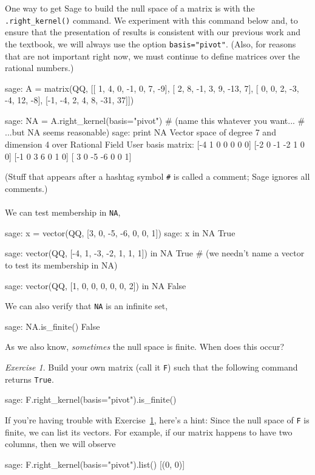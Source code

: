\documentclass[fleqn,11pt]{paper}
\theoremstyle{remark}
\newtheorem{exercise}{Exercise}
\newcommand{\<}{\ensuremath{\langle}}
\renewcommand{\>}{\ensuremath{\rangle}}
\begin{document}
One way to get Sage to build the null space of a matrix is with the
{\tt .right\_kernel()} command.
We experiment with this command below and, to ensure that the presentation of results
is consistent with our previous work and the textbook, we will always use the option {\tt basis="pivot"}.  (Also, for reasons that are not important
right now, we must continue to define matrices over the rational numbers.)
\begin{sageblock}
    sage: A = matrix(QQ, [[ 1, 4, 0, -1, 0, 7, -9],
                          [ 2, 8, -1, 3, 9, -13, 7],
                          [ 0, 0, 2, -3, -4, 12, -8],
                          [-1, -4, 2, 4, 8, -31, 37]])
    
    sage: NA = A.right_kernel(basis="pivot")  # (name this whatever you want...
                                              # ...but NA seems reasonable)
    sage: print NA
      Vector space of degree 7 and dimension 4 over Rational Field
      User basis matrix:
      [-4 1 0 0 0 0 0]
      [-2 0 -1 -2 1 0 0]
      [-1 0 3 6 0 1 0]
      [ 3 0 -5 -6 0 0 1]
\end{sageblock}
(Stuff that appears after a hashtag symbol {\tt \#} is called a comment; Sage
ignores all comments.)\\
\\
We can test membership in {\tt NA}, 
\begin{sageblock}
    sage: x = vector(QQ, [3, 0, -5, -6, 0, 0, 1])
    sage: x in NA
      True

    sage: vector(QQ, [-4, 1, -3, -2, 1, 1, 1]) in NA  
      True     # (we needn't name a vector to test its membership in NA)

    sage: vector(QQ, [1, 0, 0, 0, 0, 0, 2]) in NA
      False
\end{sageblock}
We can also verify that {\tt NA} is an
infinite set,
\begin{sageblock}
    sage: NA.is_finite()
      False
\end{sageblock}
\vskip3mm
\noindent As we also know, {\it sometimes} the null space is finite.  When does this
occur?
\vskip3mm
\begin{exercise}
  \label{ex:null-space-oper}
  Build your own matrix (call it {\tt F}) such that the following command returns {\tt True}.
  \begin{sageblock}
    sage: F.right_kernel(basis="pivot").is_finite()
  \end{sageblock}
\end{exercise}
\vskip3mm
\noindent If you're having trouble with Exercise~\ref{ex:null-space-oper}, here's a hint:
Since the null space of {\tt F} is finite, we can list
its vectors. For example, if our matrix happens to have two columns, then we will observe
\begin{sageblock}
    sage: F.right_kernel(basis="pivot").list()
      [(0, 0)]
\end{sageblock}
\vskip5mm
\end{document}
